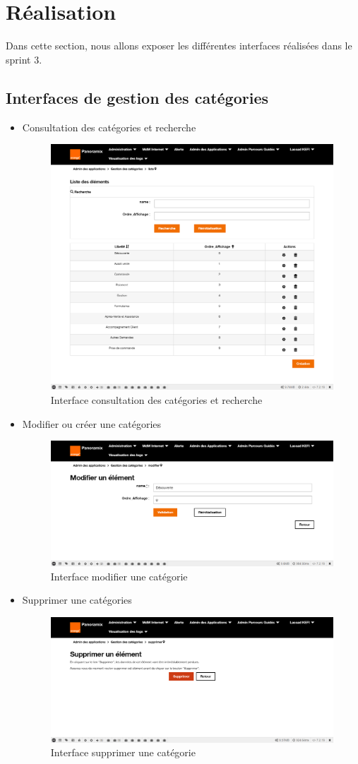 \section{Réalisation}
Dans cette section, nous allons exposer les différentes interfaces réalisées dans le sprint 3.
\subsection{Interfaces de gestion des catégories}
\begin{itemize}
	\item Consultation des catégories et recherche
	\begin{figure}[H]
		\centering
		\includegraphics[width=0.5\linewidth]{img/screenshots/categorie/index}
		\caption[Interface consultation des catégories et recherche]{Interface consultation des catégories et recherche}
		\label{fig:index-categorie}
	\end{figure}
	\newpage
	\item Modifier ou créer une catégories
	\begin{figure}[H]
		\centering
		\includegraphics[width=0.6\linewidth]{img/screenshots/categorie/create-edit}
		\caption[Interface modifier une catégorie]{Interface modifier une catégorie}
		\label{fig:edit-categorie}
	\end{figure}

	\item Supprimer une catégories
	\begin{figure}[H]
		\centering
		\includegraphics[width=0.6\linewidth]{img/screenshots/categorie/delete}
		\caption[Interface supprimer une catégorie]{Interface supprimer une catégorie}
		\label{fig:delete-categorie}
	\end{figure}
\end{itemize}


